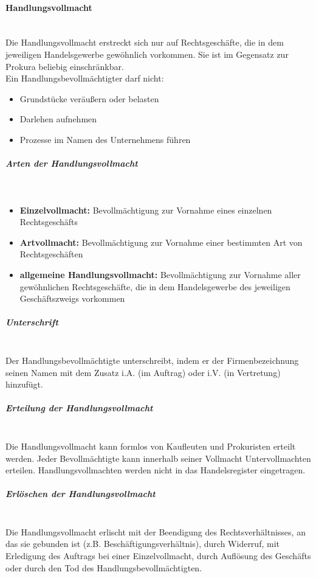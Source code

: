 \paragraph{Handlungsvollmacht}~\\
	Die Handlungsvollmacht erstreckt sich nur auf Rechtsgeschäfte, die in dem jeweiligen Handelsgewerbe gewöhnlich vorkommen. Sie ist im Gegensatz zur Prokura beliebig einschränkbar.\\
	Ein Handlungsbevollmächtigter darf nicht:\\
	\begin{itemize}
		\item Grundstücke veräußern oder belasten
		\item Darlehen aufnehmen
		\item Prozesse im Namen des Unternehmens führen
	\end{itemize}
	
\subparagraph{Arten der Handlungsvollmacht}~\\
\begin{itemize}
	\item {\bf Einzelvollmacht:} Bevollmächtigung zur Vornahme eines einzelnen Rechtsgeschäfts
	\item {\bf Artvollmacht:} Bevollmächtigung zur Vornahme einer bestimmten Art von Rechtsgeschäften
	\item {\bf allgemeine Handlungsvollmacht:} Bevollmächtigung zur Vornahme aller gewöhnlichen Rechtsgeschäfte, die in dem Handelsgewerbe des jeweiligen Geschäftszweigs vorkommen
\end{itemize}
	
\subparagraph{Unterschrift}~\\
Der Handlungsbevollmächtigte unterschreibt, indem er der Firmenbezeichnung seinen Namen mit dem Zusatz i.A. (im Auftrag) oder i.V. (in Vertretung) hinzufügt.
	
\subparagraph{Erteilung der Handlungsvollmacht}~\\
Die Handlungsvollmacht kann formlos von Kaufleuten und Prokuristen erteilt werden. Jeder Bevollmächtigte kann innerhalb seiner Vollmacht Untervollmachten erteilen. Handlungsvollmachten werden nicht in das Handelsregister eingetragen.
	
\subparagraph{Erlöschen der Handlungsvollmacht}~\\
Die Handlungsvollmacht erlischt mit der Beendigung des Rechtsverhältnisses, an das sie gebunden ist (z.B. Beschäftigungsverhältnis), durch Widerruf, mit Erledigung des Auftrags bei einer Einzelvollmacht, durch Auflösung des Geschäfts oder durch den Tod des Handlungsbevollmächtigten.
	
